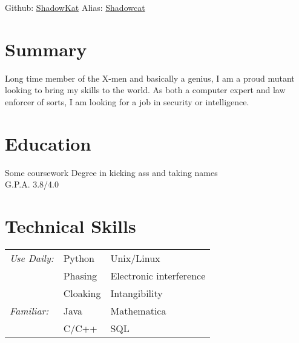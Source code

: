 \documentclass{mycv}
\begin{document}


\vspace{3pt}


%
        {Github: \href{https://github.com/mhoffies}{ShadowKat}}%
        {Alias: \href{http://marvel.wikia.com/wiki/Shadowcat}{Shadowcat}}%
        {}{}%
\section{Summary}
\noindent Long time member of the X-men and basically a genius, I am a proud mutant %
looking to bring my skills to the world. As both a computer expert and law enforcer %
of sorts, I am looking for a job in security or intelligence.

\noindent
\begin{minipage}[t]{0.5\textwidth}
  \section{Education}
  \noindent Some coursework
  \noindent Degree in kicking ass and taking names\\
  \noindent G.P.A. 3.8/4.0
\end{minipage}
\hspace{0.01\textwidth}
\begin{minipage}[t]{0.49\textwidth}        
  \section{Technical Skills}
  \begin{tabular}{l l l}
    \noindent \emph{Use Daily:} & Python & Unix/Linux \\
    \noindent \emph{} & Phasing & Electronic interference \\
    \noindent \emph{} & Cloaking & Intangibility\\
    \noindent \emph{Familiar:} & Java & Mathematica\\
    \noindent \emph{} & C/C++ & SQL\\
  \end{tabular}
\end{minipage}
\end{document}
